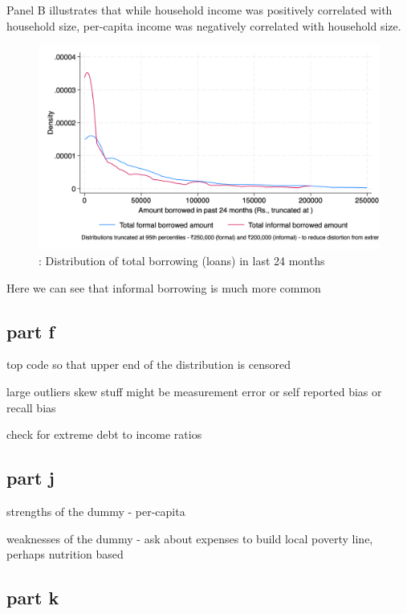 \documentclass[12pt]{article}
\begin{document}
Panel B illustrates that while household income was positively correlated with household size, per-capita income was negatively correlated with household size.


\begin{figure}[H]
    \centering
    \includegraphics[width=\textwidth]{figures/figure02_loandistribution.png}
    \caption{: Distribution of total borrowing (loans) in last 24 months}
\end{figure}

Here we can see that informal borrowing is much more common


\subsection{part f}

top code so that upper end of the distribution is censored

large outliers skew stuff
might be measurement error or self reported bias or recall bias

check for extreme debt to income ratios 


\subsection{part j}

strengths of the dummy
- per-capita


weaknesses of the dummy
- ask about expenses to build local poverty line, perhaps nutrition based



\subsection{part k}
\end{document}
